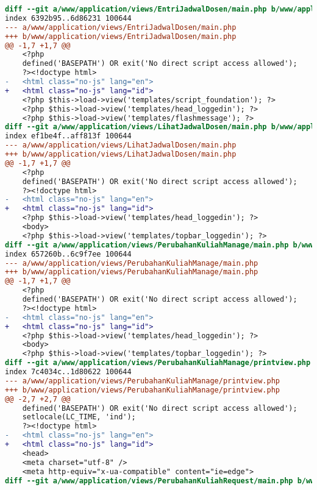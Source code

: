 \begin{lstlisting}[frame=single, label={lst:perbaikan_3.1.1_bahasa_halaman}, language=diff, caption=Perbaikan Kriteria Sukses 3.1.1 - Bahasa yang Tidak Sesuai]
diff --git a/www/application/views/EntriJadwalDosen/main.php b/www/application/views/EntriJadwalDosen/main.php
index 6392b95..6d86231 100644
--- a/www/application/views/EntriJadwalDosen/main.php
+++ b/www/application/views/EntriJadwalDosen/main.php
@@ -1,7 +1,7 @@
    <?php
    defined('BASEPATH') OR exit('No direct script access allowed');
    ?><!doctype html>
-   <html class="no-js" lang="en">
+   <html class="no-js" lang="id">
    <?php $this->load->view('templates/script_foundation'); ?>
    <?php $this->load->view('templates/head_loggedin'); ?>
    <?php $this->load->view('templates/flashmessage'); ?>
diff --git a/www/application/views/LihatJadwalDosen/main.php b/www/application/views/LihatJadwalDosen/main.php
index ef1be4f..aff813f 100644
--- a/www/application/views/LihatJadwalDosen/main.php
+++ b/www/application/views/LihatJadwalDosen/main.php
@@ -1,7 +1,7 @@
    <?php
    defined('BASEPATH') OR exit('No direct script access allowed');
    ?><!doctype html>
-   <html class="no-js" lang="en">
+   <html class="no-js" lang="id">
    <?php $this->load->view('templates/head_loggedin'); ?>
    <body>
    <?php $this->load->view('templates/topbar_loggedin'); ?>
diff --git a/www/application/views/PerubahanKuliahManage/main.php b/www/application/views/PerubahanKuliahManage/main.php
index 657260b..6c9f7ee 100644
--- a/www/application/views/PerubahanKuliahManage/main.php
+++ b/www/application/views/PerubahanKuliahManage/main.php
@@ -1,7 +1,7 @@
    <?php
    defined('BASEPATH') OR exit('No direct script access allowed');
    ?><!doctype html>
-   <html class="no-js" lang="en">
+   <html class="no-js" lang="id">
    <?php $this->load->view('templates/head_loggedin'); ?>
    <body>
    <?php $this->load->view('templates/topbar_loggedin'); ?>
diff --git a/www/application/views/PerubahanKuliahManage/printview.php b/www/application/views/PerubahanKuliahManage/printview.php
index 7c4034c..1d80622 100644
--- a/www/application/views/PerubahanKuliahManage/printview.php
+++ b/www/application/views/PerubahanKuliahManage/printview.php
@@ -2,7 +2,7 @@
    defined('BASEPATH') OR exit('No direct script access allowed');
    setlocale(LC_TIME, 'ind');
    ?><!doctype html>
-   <html class="no-js" lang="en">
+   <html class="no-js" lang="id">
    <head>
    <meta charset="utf-8" />
    <meta http-equiv="x-ua-compatible" content="ie=edge">
diff --git a/www/application/views/PerubahanKuliahRequest/main.php b/www/application/views/PerubahanKuliahRequest/main.php

\end{lstlisting}

